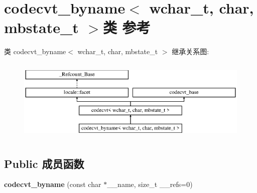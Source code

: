 \hypertarget{classcodecvt__byname_3_01wchar__t_00_01char_00_01mbstate__t_01_4}{}\section{codecvt\+\_\+byname$<$ wchar\+\_\+t, char, mbstate\+\_\+t $>$类 参考}
\label{classcodecvt__byname_3_01wchar__t_00_01char_00_01mbstate__t_01_4}
类 codecvt\+\_\+byname$<$ wchar\+\_\+t, char, mbstate\+\_\+t $>$ 继承关系图\+:\begin{figure}[H]
\begin{center}
\leavevmode
\includegraphics[height=3.985765cm]{classcodecvt__byname_3_01wchar__t_00_01char_00_01mbstate__t_01_4}
\end{center}
\end{figure}
\subsection*{Public 成员函数}
\begin{DoxyCompactItemize}
\item 
\mbox{\label{classcodecvt__byname_3_01wchar__t_00_01char_00_01mbstate__t_01_4_a2792a19fdc8d1eeeccc1ae712c4f991f}} 
{\bfseries codecvt\+\_\+byname} (const char $\ast$\+\_\+\+\_\+name, size\+\_\+t \+\_\+\+\_\+refs=0)
\end{DoxyCompactItemize}
